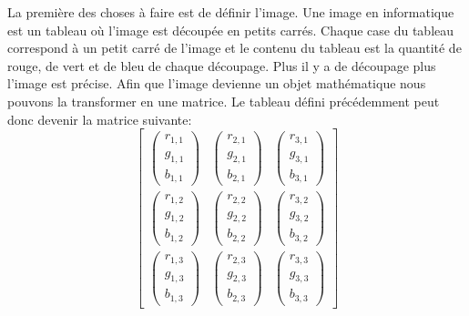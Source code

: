 \documentclass[a4paper,12pt,titlepage]{report}
\begin{document}
		La première des choses à faire est de définir l'image. Une image en informatique est un tableau où l'image est découpée en petits carrés. Chaque case du tableau correspond à un petit carré de l'image et le contenu du tableau est la quantité de rouge, de vert et de bleu de chaque découpage. Plus il y a de découpage plus l'image est précise.
		Afin que l'image devienne un objet mathématique nous pouvons la transformer en une matrice. Le tableau défini précédemment peut donc devenir la matrice suivante:
		\begin{equation}
		\begin{bmatrix} 
		\begin{pmatrix} r_{1,1} \\ g_{1,1}\\ b_{1,1} \end{pmatrix} &\begin{pmatrix} r_{2,1} \\ g_{2,1}\\ b_{2,1} \end{pmatrix}&\begin{pmatrix} r_{3,1} \\ g_{3,1}\\ b_{3,1} \end{pmatrix} 
		\\ \begin{pmatrix} r_{1,2} \\ g_{1,2}\\ b_{1,2} \end{pmatrix} & \begin{pmatrix} r_{2,2} \\ g_{2,2}\\ b_{2,2} \end{pmatrix}&\begin{pmatrix} r_{3,2} \\ g_{3,2}\\ b_{3,2} \end{pmatrix}
		\\ \begin{pmatrix} r_{1,3} \\ g_{1,3}\\ b_{1,3} \end{pmatrix} & \begin{pmatrix} r_{2,3} \\ g_{2,3}\\ b_{2,3} \end{pmatrix}&\begin{pmatrix} r_{3,3} \\ g_{3,3}\\ b_{3,3} \end{pmatrix} 
		\end{bmatrix}
		\end{equation}
\end{document}
